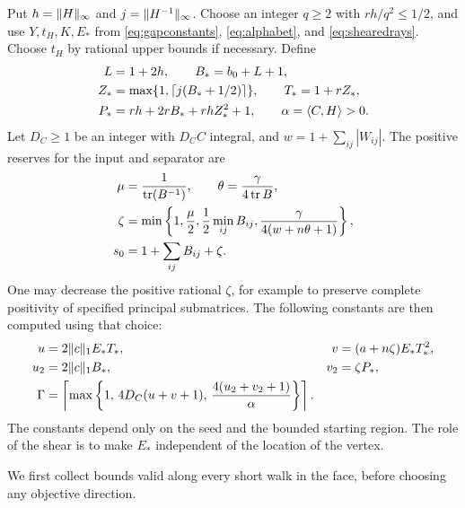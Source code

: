 Put $h=\lVert H\rVert_\infty$ and $j=\lVert H^{-1}\rVert_\infty$. Choose an integer $q\ge2$ with $rh/q^2\le1/2$, and use $Y,t_H,K,E_*$ from \eqref{eq:gapconstants}, \eqref{eq:alphabet}, and \eqref{eq:shearedrays}. Choose $t_H$ by rational upper bounds if necessary. Define
\begin{equation}\label{eq:heightconstants}
\begin{split}
 L&=1+2h,\qquad B_*=b_0+L+1,\\
 Z_*&=\max\{1,\lceil j(B_*+1/2)\rceil\},\qquad T_*=1+rZ_*,\\
 P_*&=rh+2rB_*+rhZ_*^2+1,\qquad \alpha=\langle C,H\rangle>0.
\end{split}
\end{equation}
Let $D_C\ge1$ be an integer with $D_CC$ integral, and $w=1+\sum_{ij}|W_{ij}|$. The positive reserves for the input and separator are
\begin{equation}\label{eq:robustconstants}
\begin{split}
 \mu&=\frac1{\operatorname{tr}(B^{-1})},\qquad \theta=\frac{\gamma}{4\operatorname{tr} B},\\
 \zeta&=\min\left\{1,\frac\mu2,\frac12\min_{ij}B_{ij},
                      \frac{\gamma}{4(w+n\theta+1)}\right\},\\
 s_0&=1+\sum_{ij}B_{ij}+\zeta.
\end{split}
\end{equation}
One may decrease the positive rational $\zeta$, for example to preserve complete positivity of specified principal submatrices. The following constants are then computed using that choice:
\begin{equation}\label{eq:Gamma}
\begin{aligned}
 u&=2\lVert c\rVert_1E_*T_*,&
 v&=(a+n\zeta)E_*T_*^2,\\
 u_2&=2\lVert c\rVert_1B_*,&
 v_2&=\zeta P_*,\\
 \Gamma&=\left\lceil\max\left\{1,\,
           4D_C(u+v+1),\,
           \frac{4(u_2+v_2+1)}{\alpha}\right\}\right\rceil .
\end{aligned}
\end{equation}
The constants depend only on the seed and the bounded starting region. The role of the shear is to make $E_*$ independent of the location of the vertex.

We first collect bounds valid along every short walk in the face, before choosing any objective direction.

